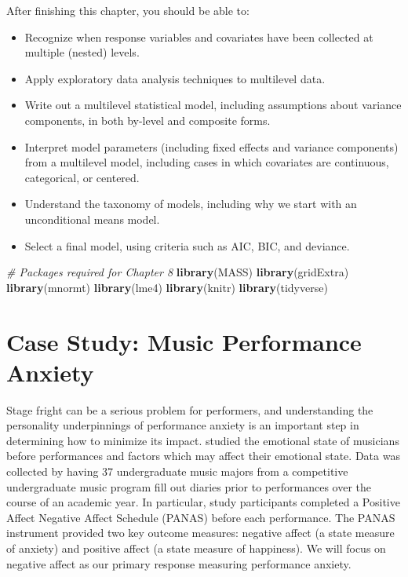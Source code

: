 \documentclass[
]{krantz}
\newenvironment{Shaded}{\begin{snugshade}}{\end{snugshade}}
\newcommand{\CommentTok}[1]{\textcolor[rgb]{0.37,0.37,0.37}{\textit{#1}}}
\newcommand{\KeywordTok}[1]{\textcolor[rgb]{0.27,0.27,0.27}{\textbf{#1}}}
\newcommand{\NormalTok}[1]{#1}
\providecommand{\tightlist}{%
  \setlength{\itemsep}{0pt}\setlength{\parskip}{0pt}}
\begin{document}
After finishing this chapter, you should be able to:

\begin{itemize}
\tightlist
\item
  Recognize when response variables and covariates have been collected at multiple (nested) levels.
\item
  Apply exploratory data analysis techniques to multilevel data.
\item
  Write out a multilevel statistical model, including assumptions about variance components, in both by-level and composite forms.
\item
  Interpret model parameters (including fixed effects and variance components) from a multilevel model, including cases in which covariates are continuous, categorical, or centered.
\item
  Understand the taxonomy of models, including why we start with an unconditional means model.
\item
  Select a final model, using criteria such as AIC, BIC, and deviance.
\end{itemize}

\begin{Shaded}
\begin{Highlighting}[]
\CommentTok{# Packages required for Chapter 8}
\KeywordTok{library}\NormalTok{(MASS)}
\KeywordTok{library}\NormalTok{(gridExtra)  }
\KeywordTok{library}\NormalTok{(mnormt) }
\KeywordTok{library}\NormalTok{(lme4) }
\KeywordTok{library}\NormalTok{(knitr) }
\KeywordTok{library}\NormalTok{(tidyverse)}
\end{Highlighting}
\end{Shaded}

\hypertarget{cs:music}{%
\section{Case Study: Music Performance Anxiety}\label{cs:music}}

Stage fright can be a serious problem for performers, and understanding the personality underpinnings of performance anxiety is an important step in determining how to minimize its impact. \citet{Miller2010} studied the emotional state of musicians before performances and factors which may affect their emotional state. Data was collected by having 37 undergraduate music majors from a competitive undergraduate music program fill out diaries prior to performances over the course of an academic year. In particular, study participants completed a Positive Affect Negative Affect Schedule (PANAS) before each performance. The PANAS instrument provided two key outcome measures: negative affect (a state measure of anxiety) and positive affect (a state measure of happiness). We will focus on negative affect as our primary response measuring performance anxiety.
\end{document}
